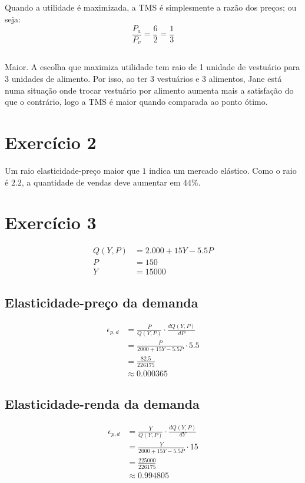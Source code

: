 \documentclass{article}
\begin{document}
\subsection{}
Quando a utilidade é maximizada, a TMS é simplesmente a razão dos preços; ou
seja:
\[
	\frac{P_a}{P_v} = \frac{6}{2} = \frac{1}{3}
\]

\subsection{}
Maior. A escolha que maximiza utilidade tem raio de 1 unidade de vestuário para
3 unidades de alimento. Por isso, ao ter 3 vestuários e 3 alimentos, Jane está
numa situação onde trocar vestuário por alimento aumenta mais a satisfação do
que o contrário, logo a TMS é maior quando comparada ao ponto ótimo.

\section{Exercício 2}
Um raio elasticidade-preço maior que \(1\) indica um mercado elástico. Como o
raio é \(2.2\), a quantidade de vendas deve aumentar em \(44\%\).

\section{Exercício 3}
\[
	\begin{aligned}
		Q(Y, P) & = 2.000 + 15Y - 5.5P \\
		P       & = 150                \\
		Y       & = 15 000
	\end{aligned}
\]
\subsection{Elasticidade-preço da demanda}
\[
	\begin{aligned}
		\epsilon_{p,d} & = \frac{P}{Q(Y, P)} \cdot \frac{dQ(Y, P)}{dP} \\
		               & = \frac{P}{2000 + 15Y - 5.5P} \cdot 5.5       \\
		               & = \frac{82.5}{226175}                         \\
		               & \approx 0.000365
	\end{aligned}
\]
\subsection{Elasticidade-renda da demanda}
\[
	\begin{aligned}
		\epsilon_{p,d} & = \frac{Y}{Q(Y, P)} \cdot \frac{dQ(Y, P)}{dY} \\
		               & = \frac{Y}{2000 + 15Y - 5.5P} \cdot 15        \\
		               & = \frac{225000}{226175}                       \\
		               & \approx 0.994805
	\end{aligned}
\]
\end{document}
